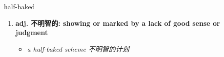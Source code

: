 
\begin{frame}
{\huge half-baked}
\begin{center}
\begin{enumerate}\Large
  \item \textbf{adj. 不明智的: showing or marked by a lack of good sense or judgment}
  \begin{itemize}
    \item \em{\Large{a half-baked scheme 不明智的计划}}
  \end{itemize}
\end{enumerate}
\end{center}
\end{frame}
